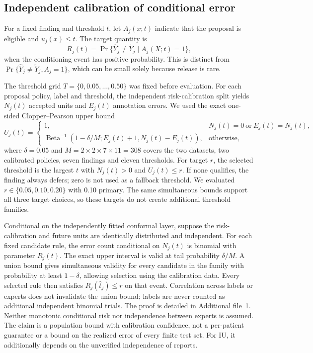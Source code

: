 \documentclass[10pt,a4paper]{article}
\begin{document}
\subsection{Independent calibration of conditional error}
For a fixed finding and threshold $t$, let $A_j(x;t)$ indicate that the proposal is eligible and $u_j(x)\leq t$. The target quantity is
\begin{equation}
R_j(t)=\Pr\{\widehat Y_j\ne\widetilde Y_j\mid A_j(X;t)=1\},
\label{eq:risk}
\end{equation}
when the conditioning event has positive probability. This is distinct from $\Pr\{\widehat Y_j\ne\widetilde Y_j, A_j=1\}$, which can be small solely because release is rare.

The threshold grid $T=\{0,0.05,\ldots,0.50\}$ was fixed before evaluation. For each proposal policy, label and threshold, the independent risk-calibration split yields $N_j(t)$ accepted units and $E_j(t)$ annotation errors. We used the exact one-sided Clopper--Pearson upper bound~\cite{cpinterval}
\begin{equation}
U_j(t)=
\begin{cases}
1, & N_j(t)=0\ \text{or}\ E_j(t)=N_j(t),\\
\operatorname{Beta}^{-1}\!\left(1-\delta/M; E_j(t)+1,N_j(t)-E_j(t)\right), & \text{otherwise},
\end{cases}
\label{eq:bound}
\end{equation}
where $\delta=0.05$ and $M=2\times2\times7\times11=308$ covers the two datasets, two calibrated policies, seven findings and eleven thresholds. For target $r$, the selected threshold is the largest $t$ with $N_j(t)>0$ and $U_j(t)\leq r$. If none qualifies, the finding always defers; zero is not used as a fallback threshold. We evaluated $r\in\{0.05,0.10,0.20\}$ with 0.10 primary. The same simultaneous bounds support all three target choices, so these targets do not create additional threshold families.

Conditional on the independently fitted conformal layer, suppose the risk-calibration and future units are identically distributed and independent. For each fixed candidate rule, the error count conditional on $N_j(t)$ is binomial with parameter $R_j(t)$. The exact upper interval is valid at tail probability $\delta/M$. A union bound gives simultaneous validity for every candidate in the family with probability at least $1-\delta$, allowing selection using the calibration data. Every selected rule then satisfies $R_j(\widehat t_j)\leq r$ on that event. Correlation across labels or experts does not invalidate the union bound; labels are never counted as additional independent binomial trials. The proof is detailed in Additional file~1. Neither monotonic conditional risk nor independence between experts is assumed. The claim is a population bound with calibration confidence, not a per-patient guarantee or a bound on the realized error of every finite test set. For IU, it additionally depends on the unverified independence of reports.
\end{document}
